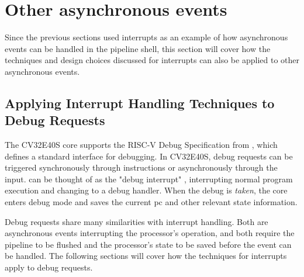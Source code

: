 %
%
%
%




\section{Other asynchronous events}%
\label{sec:other_async}

Since the previous sections used interrupts as an example of how asynchronous events can be handled in the pipeline shell, this section will cover how the techniques and design choices discussed for interrupts can also be applied to other asynchronous events.


\subsection{Applying Interrupt Handling Techniques to Debug Requests}

%

The CV32E40S core \cite{openhwgroupDebugTriggerCOREV2023} supports the RISC-V Debug Specification from \cite{pauldonahueRISCVDebugSupport2023}, which defines a standard interface for debugging. In CV32E40S, debug requests can be triggered synchronously through  instructions or asynchronously through the  input.  can be thought of as the "debug interrupt" \cite{openhwgroupDebugTriggerCOREV2023}, interrupting normal program execution and changing to a debug handler. When the debug is \textit{taken}, the core enters debug mode and saves the current \acrshort{pc} and other relevant state information.

Debug requests share many similarities with interrupt handling. Both are asynchronous events interrupting the processor's operation, and both require the pipeline to be flushed and the processor's state to be saved before the event can be handled. The following sections will cover how the techniques for interrupts apply to debug requests.  

